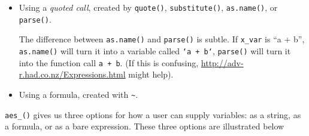 \begin{itemize}
\item
  Using a \emph{quoted call}, created by \texttt{quote()},
  \texttt{substitute()}, \texttt{as.name()}, or \texttt{parse()}.
     

\begin{Shaded}
\begin{Highlighting}[]
\NormalTok{(}
\NormalTok{(}
\NormalTok{(}\NormalTok{(} \NormalTok{x_var)[[}\NormalTok{]])}

\StringTok{ }
  \NormalTok{(}
\NormalTok{\}}
\end{Highlighting}
\end{Shaded}

  The difference between \texttt{as.name()} and \texttt{parse()} is
  subtle. If \texttt{x\_var} is ``a + b'', \texttt{as.name()} will turn
  it into a variable called \texttt{`a\ +\ b`}, \texttt{parse()} will
  turn it into the function call \texttt{a\ +\ b}. (If this is
  confusing, \url{http://adv-r.had.co.nz/Expressions.html} might help).
\item
  Using a formula, created with \texttt{\textasciitilde{}}.
  \indexc{\textasciitilde}

\begin{Shaded}
\begin{Highlighting}[]
\end{Highlighting}
\end{Shaded}
\end{itemize}

\texttt{aes\_()} gives us three options for how a user can supply
variables: as a string, as a formula, or as a bare expression. These
three options are illustrated below

